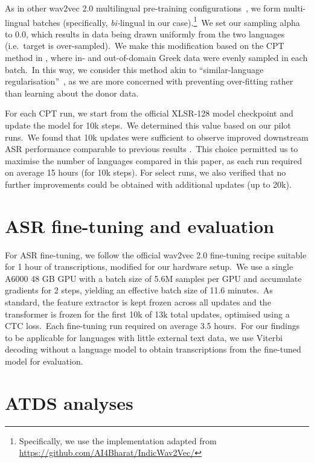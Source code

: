 \documentclass{report}
\begin{document}
As in other wav2vec 2.0 multilingual pre-training configurations~\parencite{conneau21_interspeech,babu22_interspeech,10.1609/aaai.v37i11.26521}, we form multi-lingual batches (specifically, \textit{bi-}lingual in our case).\footnote{Specifically, we use the implementation adapted from \url{https://github.com/AI4Bharat/IndicWav2Vec/}}~We set our sampling alpha to 0.0, which results in data being drawn uniformly from the two languages (i.e.~target is over-sampled).~We make this modification based on the CPT method in \textcite{paraskevopoulos2024sample}, where in- and out-of-domain Greek data were evenly sampled in each batch.~In this way, we consider this method akin to ``similar-language regularisation''~\parencite{neubig-hu-2018-rapid}, as we are more concerned with preventing over-fitting rather than learning about the donor data.

For each CPT run, we start from the official XLSR-128 model checkpoint and update the model for 10k steps.~We determined this value based on our pilot runs.~We found that 10k updates were sufficient to observe improved downstream ASR performance comparable to previous results \cite[e.g.][]{NOWAKOWSKI2023103148}.~This choice permitted us to maximise the number of languages compared in this paper, as each run required on average 15 hours (for 10k steps).
For select runs, we also verified that no further improvements could be obtained with additional updates (up to 20k).

\section{ASR fine-tuning and evaluation}

For ASR fine-tuning, we follow the official wav2vec 2.0 fine-tuning recipe suitable for 1 hour of transcriptions, modified for our hardware setup.~We use a single A6000 48 GB GPU with a batch size of 5.6M samples per GPU and accumulate gradients for 2 steps, yielding an effective batch size of 11.6 minutes.~As standard, the feature extractor is kept frozen across all updates and the transformer is frozen for the first 10k of 13k total updates, optimised using a CTC loss.~Each fine-tuning run required on average 3.5 hours.~For our findings to be applicable for languages with little external text data, we use Viterbi decoding without a language model to obtain transcriptions from the fine-tuned model for evaluation.

\section{ATDS analyses}
\end{document}
